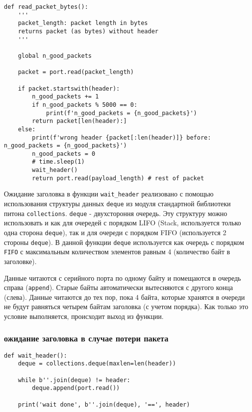 \documentclass[../main.tex]{subfiles}
\begin{document}
\begin{lstlisting}
def read_packet_bytes():
    '''
    packet_length: packet length in bytes
    returns packet (as bytes) without header
    '''

    global n_good_packets

    packet = port.read(packet_length)

    if packet.startswith(header):
        n_good_packets += 1
        if n_good_packets % 5000 == 0:
            print(f'n_good_packets = {n_good_packets}')
        return packet[len(header):]
    else:
        print(f'wrong header {packet[:len(header)]} before: n_good_packets = {n_good_packets}')
        n_good_packets = 0
        # time.sleep(1)
        wait_header()
        return port.read(payload_length) # rest of packet
\end{lstlisting}

Ожидание заголовка в функции \texttt{wait\_header} реализовано с помощью использования структуры данных \texttt{deque} из модуля стандартной библиотеки питона \texttt{collections}. \texttt{deque} - двухстороння очередь. Эту структуру можно использовать и как для очередей с порядком LIFO (Stack, используется только одна сторона \texttt{deque}), так и для очереди с порядком FIFO (используется 2 стороны \texttt{deque}). В данной функции \texttt{deque} используется как очередь с порядком \texttt{FIFO} с максимальным количеством элементов равным 4 (количество байт в заголовке).

Данные читаются с серийного порта по одному байту и помещаются в очередь справа (\texttt{append}). Старые байты автоматически вытесняются с другого конца (слева). Данные читаются до тех пор, пока 4 байта, которые хранятся в очереди не будут равняться четырем байтам заголовка (с учетом порядка). Как только это условие выполняется, происходит выход из функции.

\subsubsection{ожидание заголовка в случае потери пакета}

\begin{lstlisting}
def wait_header():
    deque = collections.deque(maxlen=len(header))

    while b''.join(deque) != header:
        deque.append(port.read())

    print('wait done', b''.join(deque), '==', header)
\end{lstlisting}
\end{document}
